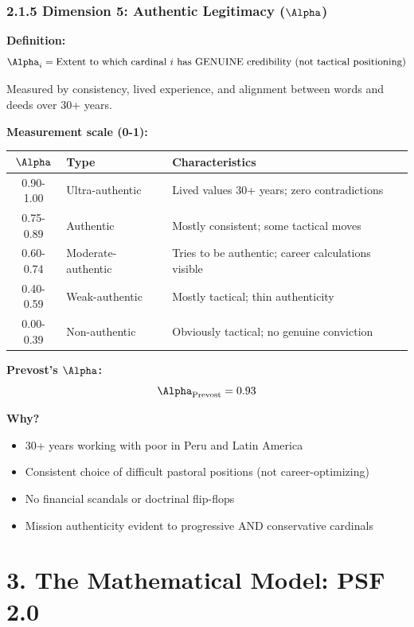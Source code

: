 \subsubsection{2.1.5 Dimension 5: Authentic Legitimacy ($\Alpha$)}

\textbf{Definition:}
$$\Alpha_i = \text{Extent to which cardinal } i \text{ has GENUINE credibility (not tactical positioning)}$$

Measured by consistency, lived experience, and alignment between words and deeds over 30+ years.

\textbf{Measurement scale (0-1):}

\begin{table}[h]
\centering
\begin{tabular}{|c|l|l|}
\hline
$\Alpha$ & \textbf{Type} & \textbf{Characteristics} \\
\hline
0.90-1.00 & Ultra-authentic & Lived values 30+ years; zero contradictions \\
0.75-0.89 & Authentic & Mostly consistent; some tactical moves \\
0.60-0.74 & Moderate-authentic & Tries to be authentic; career calculations visible \\
0.40-0.59 & Weak-authentic & Mostly tactical; thin authenticity \\
0.00-0.39 & Non-authentic & Obviously tactical; no genuine conviction \\
\hline
\end{tabular}
\end{table}

\textbf{Prevost's $\Alpha$:}
$$\Alpha_{\text{Prevost}} = 0.93$$

\textbf{Why?}
\begin{itemize}
\item 30+ years working with poor in Peru and Latin America
\item Consistent choice of difficult pastoral positions (not career-optimizing)
\item No financial scandals or doctrinal flip-flops
\item Mission authenticity evident to progressive AND conservative cardinals
\end{itemize}

\section{3. The Mathematical Model: PSF 2.0}

